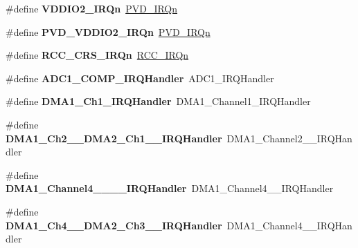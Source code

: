 \begin{DoxyCompactItemize}
\#define {\bfseries V\+D\+D\+I\+O2\+\_\+\+I\+R\+Qn}~\hyperlink{group___peripheral__interrupt__number__definition_gga7e1129cd8a196f4284d41db3e82ad5c8ab0b51ffcc4dcf5661141b79c8e5bd924}{P\+V\+D\+\_\+\+I\+R\+Qn}
\item 
\mbox{\label{group__stm32f031x6_ga6ee51c7fd35d5ddeadbff09df510e7fd}} 
\#define {\bfseries P\+V\+D\+\_\+\+V\+D\+D\+I\+O2\+\_\+\+I\+R\+Qn}~\hyperlink{group___peripheral__interrupt__number__definition_gga7e1129cd8a196f4284d41db3e82ad5c8ab0b51ffcc4dcf5661141b79c8e5bd924}{P\+V\+D\+\_\+\+I\+R\+Qn}
\item 
\mbox{\label{group__stm32f031x6_gae18a29b2efaaf8a767a2d11f7bf675f1}} 
\#define {\bfseries R\+C\+C\+\_\+\+C\+R\+S\+\_\+\+I\+R\+Qn}~\hyperlink{group___peripheral__interrupt__number__definition_gga7e1129cd8a196f4284d41db3e82ad5c8a5710b22392997bac63daa5c999730f77}{R\+C\+C\+\_\+\+I\+R\+Qn}
\item 
\mbox{\label{group__stm32f031x6_gaeb3545df015f964b68346cda78f7cea5}} 
\#define {\bfseries A\+D\+C1\+\_\+\+C\+O\+M\+P\+\_\+\+I\+R\+Q\+Handler}~A\+D\+C1\+\_\+\+I\+R\+Q\+Handler
\item 
\mbox{\label{group__stm32f031x6_ga3f7debe9fc2548ab6640825967110101}} 
\#define {\bfseries D\+M\+A1\+\_\+\+Ch1\+\_\+\+I\+R\+Q\+Handler}~D\+M\+A1\+\_\+\+Channel1\+\_\+\+I\+R\+Q\+Handler
\item 
\mbox{\label{group__stm32f031x6_ga3752ab0b9a6635ccd7bc87b99ee8fd9b}} 
\#define {\bfseries D\+M\+A1\+\_\+\+Ch2\+\_\+\_\+\+D\+M\+A2\+\_\+\+Ch1\+\_\+\_\+\+I\+R\+Q\+Handler}~D\+M\+A1\+\_\+\+Channel2\+\_\+\_\+\+I\+R\+Q\+Handler
\item 
\mbox{\label{group__stm32f031x6_gae3db46ad17e9f800e0f88b489eed522d}} 
\#define {\bfseries D\+M\+A1\+\_\+\+Channel4\+\_\+\_\+\_\+\_\+\+I\+R\+Q\+Handler}~D\+M\+A1\+\_\+\+Channel4\+\_\+\_\+\+I\+R\+Q\+Handler
\item 
\mbox{\label{group__stm32f031x6_ga035f9aa47c046222541cca70e281b415}} 
\#define {\bfseries D\+M\+A1\+\_\+\+Ch4\+\_\+\_\+\+D\+M\+A2\+\_\+\+Ch3\+\_\+\_\+\+I\+R\+Q\+Handler}~D\+M\+A1\+\_\+\+Channel4\+\_\+\_\+\+I\+R\+Q\+Handler

\end{DoxyCompactItemize}
